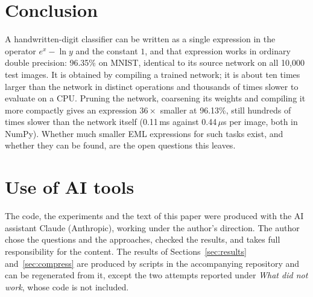 \documentclass[11pt]{article}
\begin{document}
\section{Conclusion}
A handwritten-digit classifier can be written as a single expression in the
operator $e^{x}-\ln y$ and the constant $1$, and that expression works in
ordinary double precision: 96.35\% on MNIST, identical to its source network
on all 10{,}000 test images. It is obtained by compiling a trained network;
it is about ten times larger than the network in distinct operations and
thousands of times slower to evaluate on a CPU. Pruning the network,
coarsening its weights and compiling it more compactly gives an expression
$36\times$ smaller at 96.13\%, still hundreds of times slower than the
network itself (0.11\,ms against 0.44\,$\mu$s per image, both in NumPy). Whether much smaller EML expressions for
such tasks exist, and whether they can be found, are the open questions this
leaves.



\section*{Use of AI tools}
The code, the experiments and the text of this paper were produced with the
AI assistant Claude (Anthropic), working under the author's direction. The
author chose the questions and the approaches, checked the results, and takes
full responsibility for the content. The results of Sections~\ref{sec:results}
and~\ref{sec:compress} are produced by scripts in the accompanying repository
and can be regenerated from it, except the two attempts reported under
\emph{What did not work}, whose code is not included.
\end{document}
